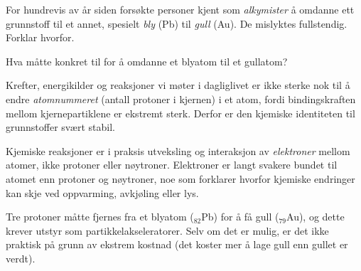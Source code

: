 

For hundrevis av år siden forsøkte personer kjent som {\it alkymister} å omdanne ett grunnstoff til et annet, spesielt {\it bly} (Pb) til {\it gull} (Au). De mislyktes fullstendig. Forklar hvorfor.

\vskip 10pt

Hva måtte konkret til for å omdanne et blyatom til et gullatom?







Krefter, energikilder og reaksjoner vi møter i dagliglivet er ikke sterke nok til å endre {\it atomnummeret} (antall protoner i kjernen) i et atom, fordi bindingskraften mellom kjernepartiklene er ekstremt sterk. Derfor er den kjemiske identiteten til grunnstoffer svært stabil.

Kjemiske reaksjoner er i praksis utveksling og interaksjon av {\it elektroner} mellom atomer, ikke protoner eller nøytroner. Elektroner er langt svakere bundet til atomet enn protoner og nøytroner, noe som forklarer hvorfor kjemiske endringer kan skje ved oppvarming, avkjøling eller lys.

\vskip 10pt

Tre protoner måtte fjernes fra et blyatom ($_{82}$Pb) for å få gull ($_{79}$Au), og dette krever utstyr som partikkelakseleratorer. Selv om det er mulig, er det ikke praktisk på grunn av ekstrem kostnad (det koster mer å lage gull enn gullet er verdt).










